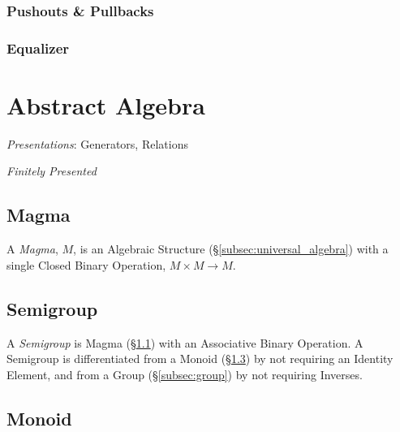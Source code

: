 \subsubsection{Pushouts \& Pullbacks}\label{subsec:category_pullback}



\subsubsection{Equalizer}\label{subsec:limit_equalizer}



\section{Abstract Algebra}\label{sec:abstract_algebra}

\emph{Presentations}: Generators, Relations

\emph{Finitely Presented}



\subsection{Magma}\label{subsec:magma}

A \emph{Magma}, $M$, is an Algebraic Structure
(\S\ref{subsec:universal_algebra}) with a single Closed Binary
Operation, $M \times M \rightarrow M$.

\subsection{Semigroup}\label{subsec:semigroup}

A \emph{Semigroup} is Magma (\S\ref{subsec:magma}) with an Associative
Binary Operation. A Semigroup is differentiated from a Monoid
(\S\ref{subsec:monoid}) by not requiring an Identity Element, and from
a Group (\S\ref{subsec:group}) by not requiring Inverses.



\subsection{Monoid}\label{subsec:monoid}

